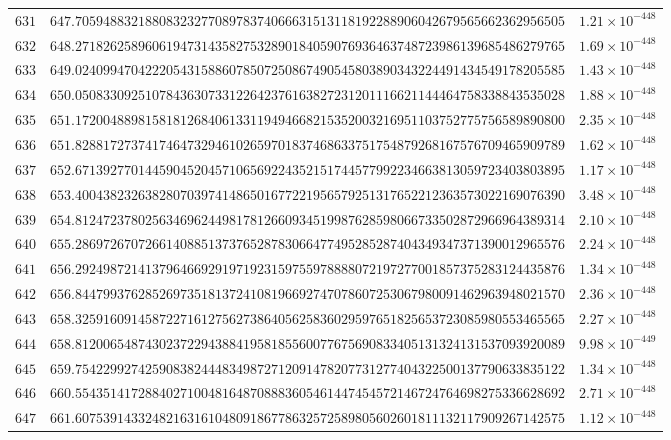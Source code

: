 \documentclass[12pt,reqno]{amsart}
\theoremstyle{remark}
\begin{document}
\begin{longtable}{clc}
$631$ & $647.7059488321880832327708978374066631513118192288906042679565662362956505$ & $1.21\times 10^{-448}$ \\
$632$ & $648.2718262589606194731435827532890184059076936463748723986139685486279765$ & $1.69\times 10^{-448}$ \\
$633$ & $649.0240994704222054315886078507250867490545803890343224491434549178205585$ & $1.43\times 10^{-448}$ \\
$634$ & $650.0508330925107843630733122642376163827231201116621144464758338843535028$ & $1.88\times 10^{-448}$ \\
$635$ & $651.1720048898158181268406133119494668215352003216951103752775756589890800$ & $2.35\times 10^{-448}$ \\
$636$ & $651.8288172737417464732946102659701837468633751754879268167576709465909789$ & $1.62\times 10^{-448}$ \\
$637$ & $652.6713927701445904520457106569224352151744577992234663813059723403803895$ & $1.17\times 10^{-448}$ \\
$638$ & $653.4004382326382807039741486501677221956579251317652212363573022169076390$ & $3.48\times 10^{-448}$ \\
$639$ & $654.8124723780256346962449817812660934519987628598066733502872966964389314$ & $2.10\times 10^{-448}$ \\
$640$ & $655.2869726707266140885137376528783066477495285287404349347371390012965576$ & $2.24\times 10^{-448}$ \\
$641$ & $656.2924987214137964669291971923159755978888072197277001857375283124435876$ & $1.34\times 10^{-448}$ \\
$642$ & $656.8447993762852697351813724108196692747078607253067980091462963948021570$ & $2.36\times 10^{-448}$ \\
$643$ & $658.3259160914587227161275627386405625836029597651825653723085980553465565$ & $2.27\times 10^{-448}$ \\
$644$ & $658.8120065487430237229438841958185560077675690833405131324131537093920089$ & $9.98\times 10^{-449}$ \\
$645$ & $659.7542299274259083824448349872712091478207731277404322500137790633835122$ & $1.34\times 10^{-448}$ \\
$646$ & $660.5543514172884027100481648708883605461447454572146724764698275336628692$ & $2.71\times 10^{-448}$ \\
$647$ & $661.6075391433248216316104809186778632572589805602601811132117909267142575$ & $1.12\times 10^{-448}$ \\

\end{longtable}
\end{document}
